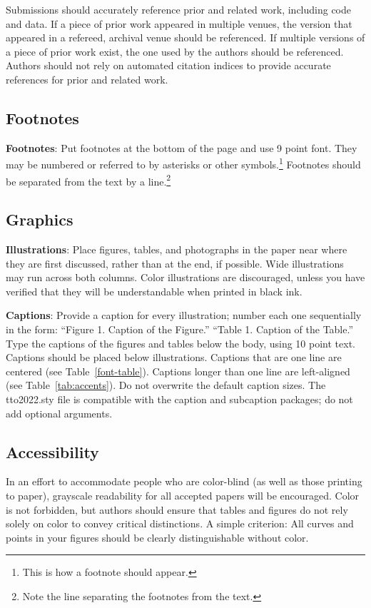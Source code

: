 \documentclass[11pt,a4paper]{article}
\begin{document}
Submissions should accurately reference prior and related work, including code and data. If a piece of prior work appeared in multiple venues, the version that appeared in a refereed, archival venue should be referenced. If multiple versions of a piece of prior work exist, the one used by the authors should be referenced. Authors should not rely on automated citation indices to provide accurate references for prior and related work.

\subsection{Footnotes}

\textbf{Footnotes}: Put footnotes at the bottom of the page and use 9
point font. They may be numbered or referred to by asterisks or other
symbols.\footnote{This is how a footnote should appear.} Footnotes
should be separated from the text by a line.\footnote{Note the line
separating the footnotes from the text.}

\subsection{Graphics}

\textbf{Illustrations}: Place figures, tables, and photographs in the
paper near where they are first discussed, rather than at the end, if
possible.  Wide illustrations may run across both columns.  Color
illustrations are discouraged, unless you have verified that  
they will be understandable when printed in black ink.

\textbf{Captions}: Provide a caption for every illustration; number each one
sequentially in the form:  ``Figure 1. Caption of the Figure.'' ``Table 1.
Caption of the Table.''  Type the captions of the figures and 
tables below the body, using 10 point text. Captions should be placed below illustrations. Captions that are one line are centered (see Table~\ref{font-table}). Captions longer than one line are left-aligned (see Table~\ref{tab:accents}). Do not overwrite the default caption sizes. The tto2022.sty file is compatible with the caption and subcaption packages; do not add optional arguments.


\subsection{Accessibility}
\label{ssec:accessibility}

In an effort to accommodate people who are color-blind (as well as those printing
to paper), grayscale readability for all accepted papers will be
encouraged.  Color is not forbidden, but authors should ensure that
tables and figures do not rely solely on color to convey critical
distinctions. A simple criterion: All curves and points in your figures should be clearly distinguishable without color.
\end{document}
